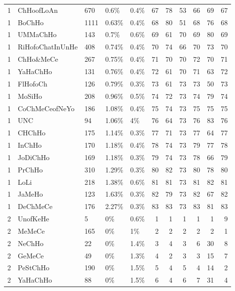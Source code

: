\begin{longtable}{lllllrrrrrr}
  1 & ChHoofLoAn & 670 & 0.6\% & 0.4\% &  67 &  78 &  53 &  66 &  69 &  67 \\ 
  1 & BoChHo & 1111 & 0.63\% & 0.4\% &  68 &  80 &  51 &  68 &  76 &  68 \\ 
  1 & UMMaChHo & 143 & 0.7\% & 0.6\% &  69 &  61 &  70 &  69 &  80 &  69 \\ 
  1 & RiHofoChatInUnHe & 408 & 0.74\% & 0.4\% &  70 &  74 &  66 &  70 &  73 &  70 \\ 
  1 & ChHo\&MeCe & 267 & 0.75\% & 0.4\% &  71 &  70 &  70 &  72 &  70 &  71 \\ 
  1 & YaHaChHo & 131 & 0.76\% & 0.4\% &  72 &  61 &  70 &  71 &  63 &  72 \\ 
  1 & FlHofoCh & 126 & 0.79\% & 0.3\% &  73 &  61 &  73 &  73 &  50 &  73 \\ 
  1 & MoSiHo & 208 & 0.96\% & 0.5\% &  74 &  72 &  73 &  74 &  79 &  74 \\ 
  1 & CoChMeCeofNeYo & 186 & 1.08\% & 0.4\% &  75 &  74 &  73 &  75 &  75 &  75 \\ 
  1 & UNC & 94 & 1.06\% & 4\% &  76 &  64 &  73 &  76 &  83 &  76 \\ 
  1 & CHChHo & 175 & 1.14\% & 0.3\% &  77 &  71 &  73 &  77 &  64 &  77 \\ 
  1 & InChHo & 170 & 1.18\% & 0.4\% &  78 &  74 &  73 &  79 &  77 &  78 \\ 
  1 & JoDiChHo & 169 & 1.18\% & 0.3\% &  79 &  74 &  73 &  78 &  66 &  79 \\ 
  1 & PrChHo & 310 & 1.29\% & 0.3\% &  80 &  82 &  73 &  80 &  78 &  80 \\ 
  1 & LoLi & 218 & 1.38\% & 0.6\% &  81 &  81 &  73 &  81 &  82 &  81 \\ 
  1 & JaMeHo & 123 & 1.63\% & 0.3\% &  82 &  79 &  73 &  82 &  67 &  82 \\ 
  1 & DeChMeCe & 176 & 2.27\% & 0.3\% &  83 &  83 &  73 &  83 &  81 &  83 \\ 
  2 & UnofKeHe & 5 & 0\% & 0.6\% &   1 &   1 &   1 &   1 &   1 &   9 \\ 
  2 & MeMeCe & 165 & 0\% & 1\% &   2 &   2 &   2 &   2 &   2 &   1 \\ 
  2 & NeChHo & 22 & 0\% & 1.4\% &   3 &   4 &   3 &   6 &  30 &   8 \\ 
  2 & GeMeCe & 49 & 0\% & 1.3\% &   4 &   2 &   3 &   3 &  15 &   7 \\ 
  2 & PeStChHo & 190 & 0\% & 1.5\% &   5 &   4 &   5 &   4 &  14 &   2 \\ 
  2 & YaHaChHo & 88 & 0\% & 1.5\% &   6 &   4 &   6 &   7 &  31 &   4 \\ 

\end{longtable}

